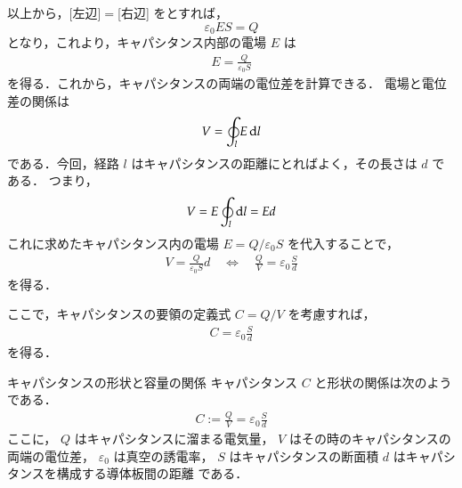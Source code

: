         以上から，\mbox{[左辺]}$=$[右辺] をとすれば，
            \begin{equation*}
                \varepsilon_{0} ES = Q
            \end{equation*}
        となり，これより，キャパシタンス内部の電場 $E$ は
            \begin{align}
                E = \frac{Q}{\varepsilon_{0}S}
            \end{align}
        を得る．これから，キャパシタンスの両端の電位差を計算できる．
        電場と電位差の関係は
            \begin{equation*}
                V = \oint_{l} E \,\mathrm{d} l
            \end{equation*}
        である．今回，経路 $l$ はキャパシタンスの距離にとればよく，その長さは $d$ である．
        つまり，
            \begin{equation*}
                V = E \oint_{l} \,\mathrm{d} l = Ed
            \end{equation*}
        これに求めたキャパシタンス内の電場 $E = Q/\varepsilon_{0}S$ を代入することで，
            \begin{align}
                V = \frac{Q}{\varepsilon_{0}S}d
                \quad\Leftrightarrow\quad
                \frac{Q}{V} = \varepsilon_{0}\frac{S}{d}
            \end{align}
        を得る．

        ここで，キャパシタンスの要領の定義式 $C = Q/V$ を考慮すれば，
            \begin{align}
                C = \varepsilon_{0}\frac{S}{d}
            \end{align}
        を得る．
            \begin{myshadebox}{キャパシタンスの形状と容量の関係}
                キャパシタンス $C$ と形状の関係は次のようである．
                    \begin{align}
                        C:=\frac{Q}{V} = \varepsilon_{0}\frac{S}{d}
                    \end{align}
                ここに，
                        $Q$ はキャパシタンスに溜まる電気量，
                        $V$ はその時のキャパシタンスの両端の電位差，
                        $\varepsilon_{0}$ は真空の誘電率，
                        $S$ はキャパシタンスの断面積
                        $d$ はキャパシタンスを構成する導体板間の距離
                である．
            \end{myshadebox}

